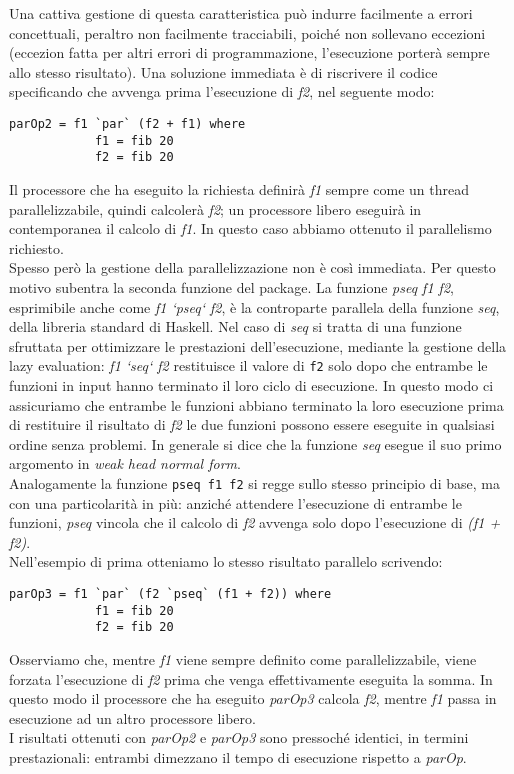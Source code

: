 Una cattiva gestione di questa caratteristica può indurre facilmente a errori concettuali, peraltro non facilmente tracciabili, poiché non sollevano eccezioni (eccezion fatta per altri errori di programmazione, l'esecuzione porterà sempre allo stesso risultato). Una soluzione immediata è di riscrivere il codice specificando che avvenga prima l'esecuzione di \textit{f2}, nel seguente modo:
\begin{verbatim}
parOp2 = f1 `par` (f2 + f1) where
            f1 = fib 20
            f2 = fib 20
\end{verbatim}
Il processore che ha eseguito la richiesta definirà \textit{f1} sempre come un thread parallelizzabile, quindi calcolerà \textit{f2}; un processore libero eseguirà in contemporanea il calcolo di \textit{f1}. In questo caso abbiamo ottenuto il parallelismo richiesto.\\
Spesso però la gestione della parallelizzazione non è così immediata. Per questo motivo subentra la seconda funzione del package. La funzione \textit{pseq f1 f2}, esprimibile anche come \textit{f1 `pseq` f2}, è la controparte parallela della funzione \textit{seq}, della libreria standard di Haskell. Nel caso di \textit{seq} si tratta di una funzione sfruttata per ottimizzare le prestazioni dell'esecuzione, mediante la gestione della lazy evaluation: \textit{f1 `seq` f2} restituisce il valore di \texttt{f2} solo dopo che entrambe le funzioni in input hanno terminato il loro ciclo di esecuzione. In questo modo ci assicuriamo che entrambe le funzioni abbiano terminato la loro esecuzione prima di restituire il risultato di \textit{f2} le due funzioni possono essere eseguite in qualsiasi ordine senza problemi. In generale si dice che la funzione \textit{seq} esegue il suo primo argomento in \textit{weak head normal form}.\\
Analogamente la funzione \texttt{pseq f1 f2} si regge sullo stesso principio di base, ma con una particolarità in più: anziché attendere l'esecuzione di entrambe le funzioni, \textit{pseq} vincola che il calcolo di \textit{f2} avvenga solo dopo l'esecuzione di \textit{(f1 + f2)}.\\
Nell'esempio di prima otteniamo lo stesso risultato parallelo scrivendo:
\begin{verbatim}
parOp3 = f1 `par` (f2 `pseq` (f1 + f2)) where
            f1 = fib 20
            f2 = fib 20
\end{verbatim}
Osserviamo che, mentre \textit{f1} viene sempre definito come parallelizzabile, viene forzata l'esecuzione di \textit{f2} prima che venga effettivamente eseguita la somma. In questo modo il processore che ha eseguito \textit{parOp3} calcola \textit{f2}, mentre \textit{f1} passa in esecuzione ad un altro processore libero.\\
I risultati ottenuti con \textit{parOp2} e \textit{parOp3} sono pressoché identici, in termini prestazionali: entrambi dimezzano il tempo di esecuzione rispetto a \textit{parOp}.
